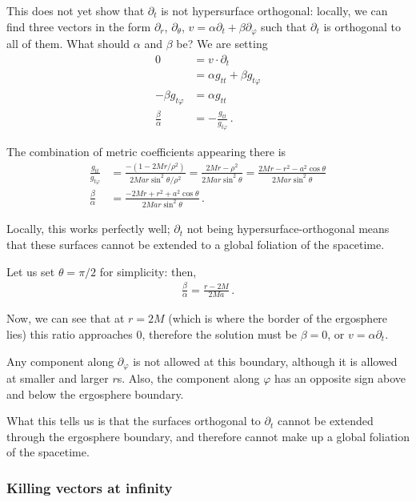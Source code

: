 \documentclass[main.tex]{subfiles}
\begin{document}
This does not yet show that \(\partial_t\) is not hypersurface orthogonal: locally, we can find three vectors in the form \(\partial_r\), 
\(\partial_\theta \), \(v = \alpha \partial_t + \beta \partial_\varphi\) such that \(\partial_t\) is orthogonal to all of them. 
What should \(\alpha \) and \(\beta \) be? 
We are setting 
%
\begin{align}
0 &= v \cdot \partial_t \\
&= \alpha g_{tt} + \beta g_{t \varphi }  \\
- \beta g_{t \varphi } &= \alpha g_{tt}   \\
\frac{\beta }{\alpha} &= - \frac{ g_{t t }}{g_{t \varphi }}
\,.
\end{align}

The combination of metric coefficients appearing there is %
\begin{align}
\frac{g_{tt}}{g_{t \varphi }} &= 
\frac{- (1 - 2Mr / \rho^2)}{2Mar \sin^2 \theta / \rho^2} = \frac{2Mr - \rho^2}{2Mar \sin^2\theta } = \frac{2Mr - r^2 - a^2 \cos \theta }{2Mar \sin^2 \theta }  \\
\frac{\beta }{\alpha} &= \frac{ -2Mr + r^2 + a^2 \cos \theta}{2Mar \sin^2 \theta }
\,.
\end{align}

Locally, this works perfectly well; \(\partial_t\) not being hypersurface-orthogonal 
means that these surfaces cannot be extended to a global foliation of the spacetime. 

Let us set \(\theta = \pi /2\) for simplicity: then, 
%
\begin{align}
\frac{\beta }{\alpha} = \frac{r - 2M}{2Ma}
\,.
\end{align}

Now, we can see that at \(r = 2M\) (which is where the border of the ergosphere lies) this ratio approaches 0, therefore the 
solution must be \(\beta = 0\), or \(v = \alpha \partial_t\).

Any component along \(\partial_\varphi\) is not allowed at this boundary, although it is allowed at smaller and larger \(r\)s.
Also, the component along \(\varphi \) has an opposite sign above and below the ergosphere boundary. 

What this tells us is that the surfaces orthogonal to \(\partial_t\) cannot be extended through the ergosphere boundary, and therefore cannot make up a global foliation of the spacetime.

\subsubsection{Killing vectors at infinity}
\end{document}

